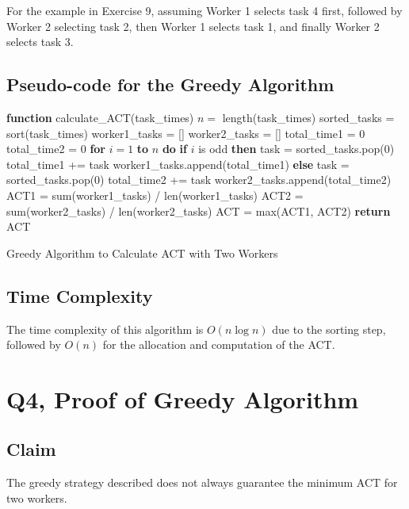 \documentclass{article}
\begin{document}
For the example in Exercise 9, assuming Worker 1 selects task 4 first, followed by Worker 2 selecting task 2, then Worker 1 selects task 1, and finally Worker 2 selects task 3.

\subsection*{Pseudo-code for the Greedy Algorithm}
\begin{algorithm}
\begin{algorithmic}
\State \textbf{function} calculate\_ACT(task\_times)
\State \quad $n = $ length(task\_times)
\State \quad sorted\_tasks = sort(task\_times)
\State \quad worker1\_tasks = []
\State \quad worker2\_tasks = []
\State \quad total\_time1 = 0
\State \quad total\_time2 = 0
\State \quad \textbf{for} $i = 1$ \textbf{to} $n$ \textbf{do}
\State \quad \quad \textbf{if} $i$ is odd \textbf{then}
\State \quad \quad \quad task = sorted\_tasks.pop(0)
\State \quad \quad \quad total\_time1 += task
\State \quad \quad \quad worker1\_tasks.append(total\_time1)
\State \quad \quad \textbf{else}
\State \quad \quad \quad task = sorted\_tasks.pop(0)
\State \quad \quad \quad total\_time2 += task
\State \quad \quad \quad worker2\_tasks.append(total\_time2)
\State \quad ACT1 = sum(worker1\_tasks) / len(worker1\_tasks)
\State \quad ACT2 = sum(worker2\_tasks) / len(worker2\_tasks)
\State \quad ACT = max(ACT1, ACT2)
\State \quad \textbf{return} ACT
\end{algorithmic}
\caption{Greedy Algorithm to Calculate ACT with Two Workers}
\end{algorithm}

\subsection*{Time Complexity}
The time complexity of this algorithm is $O(n \log n)$ due to the sorting step, followed by $O(n)$ for the allocation and computation of the ACT.

\section{Q4, Proof of Greedy Algorithm}


\subsection*{Claim}
The greedy strategy described does not always guarantee the minimum ACT for two workers.
\end{document}
